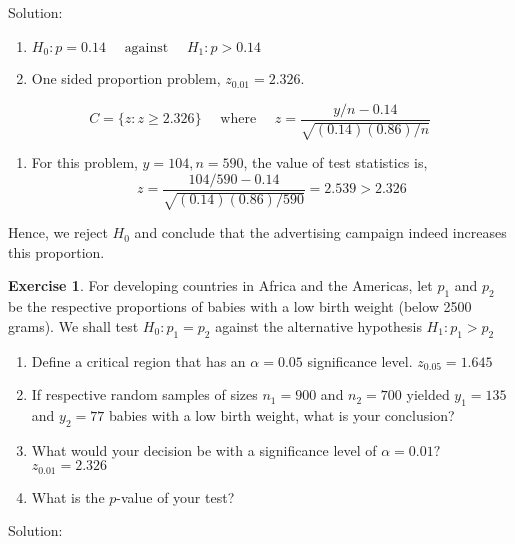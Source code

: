 \documentclass[
]{book}
\providecommand{\tightlist}{%
  \setlength{\itemsep}{0pt}\setlength{\parskip}{0pt}}
\theoremstyle{definition}
\theoremstyle{definition}
\theoremstyle{definition}
\newtheorem{exercise}{Exercise}[chapter]
\theoremstyle{remark}
\begin{document}
Solution:

\begin{enumerate}
\def\labelenumi{\arabic{enumi}.}
\item
  \(H_{0}: p=0.14 \quad \text { against } \quad H_{1}: p>0.14\)
\item
  One sided proportion problem, \(z_{0.01} = 2.326\).
\end{enumerate}

\begin{equation}
C=\{z: z \geq 2.326\} \quad \text { where } \quad z=\frac{y / n-0.14}{\sqrt{(0.14)(0.86) / n}}
\end{equation}

\begin{enumerate}
\def\labelenumi{\arabic{enumi}.}
\setcounter{enumi}{2}
\tightlist
\item
  For this problem, \(y=104, n=590\), the value of test statistics is,
  \begin{equation}
  z=\frac{104 / 590-0.14}{\sqrt{(0.14)(0.86) / 590}}=2.539>2.326
  \end{equation}
\end{enumerate}

Hence, we reject \(H_0\) and conclude that the advertising campaign indeed increases this proportion.

\begin{exercise}
\protect\hypertarget{exr:q74}{}{\label{exr:q74} } For developing countries in Africa and the Americas, let \(p_{1}\) and \(p_{2}\) be the respective proportions of babies with a low birth weight (below 2500 grams). We shall test \(H_{0}: p_{1}=p_{2}\) against the alternative hypothesis \(H_{1}: p_{1}>p_{2}\)

\begin{enumerate}
\def\labelenumi{\arabic{enumi}.}
\item
  Define a critical region that has an \(\alpha=0.05\) significance level. \(z_{0.05}=1.645\)
\item
  If respective random samples of sizes \(n_{1}=900\) and \(n_{2}=700\) yielded \(y_{1}=135\) and \(y_{2}=77\) babies with a low birth weight, what is your conclusion?
\item
  What would your decision be with a significance level of \(\alpha=0.01 ?\) \(z_{0.01}=2.326\)
\item
  What is the \(p\)-value of your test?
\end{enumerate}
\end{exercise}

Solution:
\end{document}
